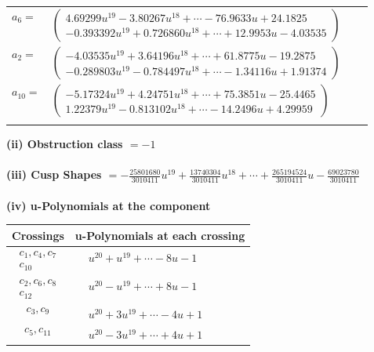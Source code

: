 \documentclass[1p]{elsarticle_modified}
\theoremstyle{definition}
\begin{document}
\begin{tabular}{m{7pt} m{180pt} m{7pt} m{180pt} }
\flushright $a_{6}=$&$\begin{pmatrix}4.69299 u^{19}-3.80267 u^{18}+\cdots-76.9633 u+24.1825\\-0.393392 u^{19}+0.726860 u^{18}+\cdots+12.9953 u-4.03535\end{pmatrix}$ \\
\flushright $a_{2}=$&$\begin{pmatrix}-4.03535 u^{19}+3.64196 u^{18}+\cdots+61.8775 u-19.2875\\-0.289803 u^{19}-0.784497 u^{18}+\cdots-1.34116 u+1.91374\end{pmatrix}$ \\
\flushright $a_{10}=$&$\begin{pmatrix}-5.17324 u^{19}+4.24751 u^{18}+\cdots+75.3851 u-25.4465\\1.22379 u^{19}-0.813102 u^{18}+\cdots-14.2496 u+4.29959\end{pmatrix}$\\&\end{tabular}
\flushleft \textbf{(ii) Obstruction class $= -1$}\\~\\
\flushleft \textbf{(iii) Cusp Shapes $= -\frac{25801680}{3010411} u^{19}+\frac{13740304}{3010411} u^{18}+\cdots+\frac{265194524}{3010411} u-\frac{69023780}{3010411}$}\\~\\
\newpage\renewcommand{\arraystretch}{1}
\flushleft \textbf{(iv) u-Polynomials at the component}\newline \\
\begin{tabular}{m{50pt}|m{274pt}}
Crossings & \hspace{64pt}u-Polynomials at each crossing \\
\hline $$\begin{aligned}c_{1},c_{4},c_{7}\\c_{10}\end{aligned}$$&$\begin{aligned}
&u^{20}+u^{19}+\cdots-8 u-1
\end{aligned}$\\
\hline $$\begin{aligned}c_{2},c_{6},c_{8}\\c_{12}\end{aligned}$$&$\begin{aligned}
&u^{20}- u^{19}+\cdots+8 u-1
\end{aligned}$\\
\hline $$\begin{aligned}c_{3},c_{9}\end{aligned}$$&$\begin{aligned}
&u^{20}+3 u^{19}+\cdots-4 u+1
\end{aligned}$\\
\hline $$\begin{aligned}c_{5},c_{11}\end{aligned}$$&$\begin{aligned}
&u^{20}-3 u^{19}+\cdots+4 u+1
\end{aligned}$\\
\hline
\end{tabular}\\~\\
\end{document}
